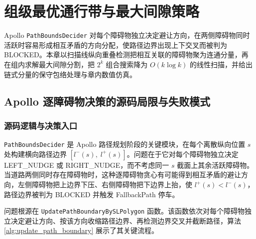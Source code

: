 \chapter{组级最优通行带与最大间隙策略}
\label{chap:group}

Apollo \texttt{PathBoundsDecider} 对每个障碍物独立决定避让方向，在两侧障碍物同时活跃时容易形成相互矛盾的方向分配，使路径边界出现上下交叉而被判为 BLOCKED。本章以扫描线纵向重叠检测把相互关联的障碍物聚为连通分量，再在组内求解最大间隙分割，把 $2^k$ 组合搜索降为 $O(k\log k)$ 的线性扫描，并给出链式分量的保守包络处理与章内数值仿真。

\section{Apollo 逐障碍物决策的源码局限与失败模式}
\label{sec:problem_sl}

\subsection{源码逻辑与决策入口}

\texttt{PathBoundsDecider} 是 Apollo 路径规划阶段的关键模块，在每个离散纵向位置 $s$ 处构建横向路径边界 $[l^-(s),\; l^+(s)]$。问题在于它对每个障碍物独立决定 LEFT\_NUDGE 或 RIGHT\_NUDGE，而不考虑同一 $s$ 截面上其余活跃障碍物。当道路两侧同时存在障碍物时，这种逐障碍物贪心有可能得到相互矛盾的避让方向，左侧障碍物把上边界下压、右侧障碍物把下边界上抬，使 $l^+(s) < l^-(s)$，路径边界被判为 BLOCKED 并触发 FallbackPath 停车。

问题根源在 \texttt{UpdatePathBoundary\-BySLPolygon} 函数。该函数依次对每个障碍物独立决定避让方向、按该方向收缩路径边界、再检测边界交叉并截断路径，算法 \ref{alg:update_path_boundary} 展示了其关键流程。

